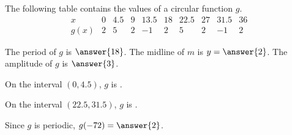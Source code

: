 \documentclass{ximera}
\author{Kenneth Berglund}
\begin{document}
\begin{exercise}
The following table contains the values of a circular function $g$. 
$$
\begin{array}{c|ccccccccc}
x&0&4.5&9&13.5&18&22.5&27&31.5&36\\
\hline
g(x)&2&5&2&-1&2&5&2&-1&2
\end{array}
$$

The period of $g$ is $\answer{18}$. The midline of $m$ is $y = \answer{2}$. The amplitude of $g$ is $\answer{3}$.

On the interval $(0, 4.5)$, $g$ is .

On the interval $(22.5, 31.5)$, $g$ is .

Since $g$ is periodic, $g(-72) = \answer{2}$. 


\end{exercise}
\end{document}
